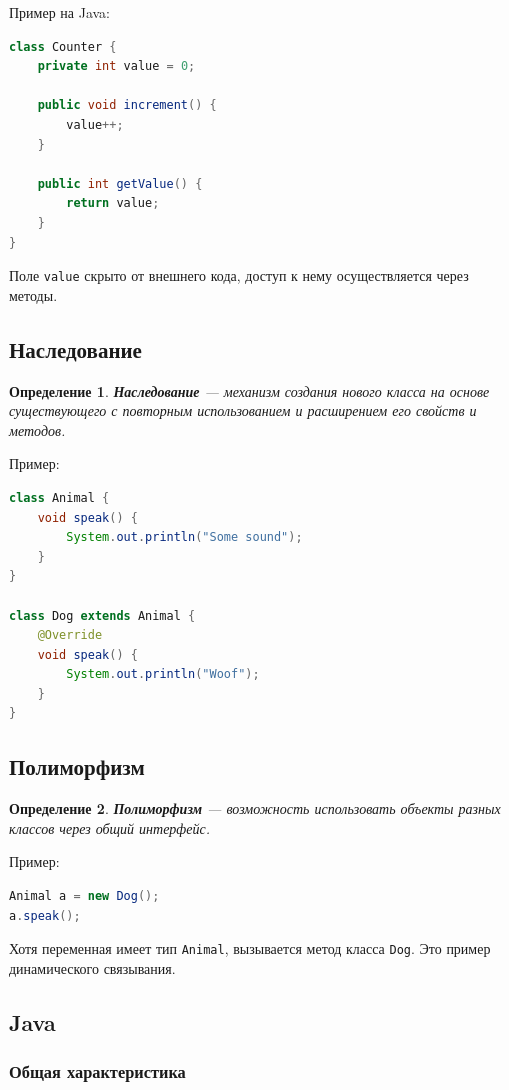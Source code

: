 \documentclass[12pt,a4paper]{article}
\newtheorem{definition}{Определение}
\begin{document}
Пример на Java:
\begin{lstlisting}[language=Java]
class Counter {
    private int value = 0;

    public void increment() {
        value++;
    }

    public int getValue() {
        return value;
    }
}
\end{lstlisting}

Поле \texttt{value} скрыто от внешнего кода, доступ к нему осуществляется через методы.

\subsection{Наследование}

\begin{definition}
\textbf{Наследование} --- механизм создания нового класса на основе существующего с повторным использованием и расширением его свойств и методов.
\end{definition}

Пример:
\begin{lstlisting}[language=Java]
class Animal {
    void speak() {
        System.out.println("Some sound");
    }
}

class Dog extends Animal {
    @Override
    void speak() {
        System.out.println("Woof");
    }
}
\end{lstlisting}

\subsection{Полиморфизм}

\begin{definition}
\textbf{Полиморфизм} --- возможность использовать объекты разных классов через общий интерфейс.
\end{definition}

Пример:
\begin{lstlisting}[language=Java]
Animal a = new Dog();
a.speak();
\end{lstlisting}

Хотя переменная имеет тип \texttt{Animal}, вызывается метод класса \texttt{Dog}. Это пример динамического связывания.

\subsection{Java}

\subsubsection{Общая характеристика}
\end{document}
